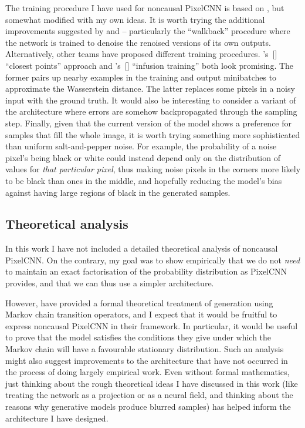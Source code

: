 \documentclass[11pt, a4paper, openany]{book}
\newcommand{\nquote}[1]{``{#1}''}
\newcommand\cites[1]{\citeauthor{#1}'s\ [\citeyear{#1}]}
\begin{document}
The training procedure I have used for noncausal PixelCNN is based on \citet{gsnnade}, but somewhat modified with my own ideas. It is worth trying the additional improvements suggested by \citet{denoisinggenerative} and \citet{transitionstochastic} -- particularly the \nquote{walkback} procedure where the network is trained to denoise the renoised versions of its own outputs. Alternatively, other teams have proposed different training procedures. \cites{iterativeclosest} \nquote{closest points} approach and \cites{infusion} \nquote{infusion training} both look promising. The former pairs up nearby examples in the training and output minibatches to approximate the Wasserstein distance. The latter replaces some pixels in a noisy input with the ground truth. It would also be interesting to consider a variant of the architecture where errors are somehow backpropagated through the sampling step. Finally, given that the current version of the model shows a preference for samples that fill the whole image, it is worth trying something more sophisticated than uniform salt-and-pepper noise. For example, the probability of a noise pixel's being black or white could instead depend only on the distribution of values for \emph{that particular pixel}, thus making noise pixels in the corners more likely to be black than ones in the middle, and hopefully reducing the model's bias against having large regions of black in the generated samples.

\subsection{Theoretical analysis}

In this work I have not included a detailed theoretical analysis of noncausal PixelCNN. On the contrary, my goal was to show empirically that we do not \emph{need} to maintain an exact factorisation of the probability distribution as PixelCNN provides, and that we can thus use a simpler architecture.

However, \citet{gsn} have provided a formal theoretical treatment of generation using Markov chain transition operators, and I expect that it would be fruitful to express noncausal PixelCNN in their framework. In particular, it would be useful to prove that the model satisfies the conditions they give under which the Markov chain will have a favourable stationary distribution. Such an analysis might also suggest improvements to the architecture that have not occurred in the process of doing largely empirical work. Even without formal mathematics, just thinking about the rough theoretical ideas I have discussed in this work (like treating the network as a projection or as a neural field, and thinking about the reasons why generative models produce blurred samples) has helped inform the architecture I have designed.
\end{document}
